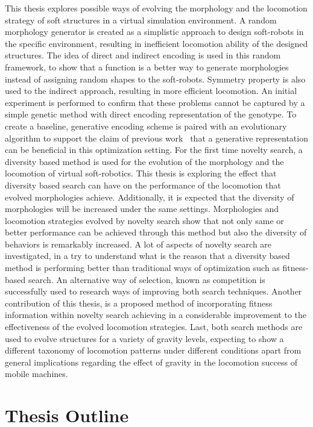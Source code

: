 This thesis explores possible ways of evolving the morphology and the locomotion strategy of soft structures in a virtual simulation environment. A random morphology generator is created as a simplistic approach to design soft-robots in the specific environment, resulting in inefficient locomotion ability of the designed structures. The idea of direct and indirect encoding is used in this random framework, to show that a function is a better way to generate morphologies instead of assigning random shapes to the soft-robots. Symmetry property is also used to the indirect approach, resulting in more efficient locomotion. An initial experiment is performed to confirm that these problems cannot be captured by a simple genetic method with direct encoding representation of the genotype. To create a baseline, generative encoding scheme is paired with an evolutionary algorithm to support the claim of previous work~\citep{cheney2013unshackling} that a generative representation can be beneficial in this optimization setting. For the first time novelty search, a diversity based method is used for the evolution of the morphology and the locomotion of virtual soft-robotics. This thesis is exploring the effect that diversity based search can have on the performance of the locomotion that evolved morphologies achieve. Additionally, it is expected that the diversity of morphologies will be increased under the same settings. Morphologies and locomotion strategies evolved by novelty search show that not only same or better performance can be achieved through this method but also the diversity of behaviors is remarkably increased. A lot of aspects of novelty search are investigated, in a try to understand what is the reason that a diversity based method is performing better than traditional ways of optimization such as fitness-based search. An alternative way of selection, known as competition is successfully used to research ways of improving both search techniques. Another contribution of this thesis, is a proposed method of incorporating fitness information within novelty search achieving in a considerable improvement to the effectiveness of the evolved locomotion strategies. Last, both search methods are used to evolve structures for a variety of gravity levels, expecting to show a different taxonomy of locomotion patterns under different conditions apart from general implications regarding the effect of gravity in the locomotion success of mobile machines.


\section{Thesis Outline}

